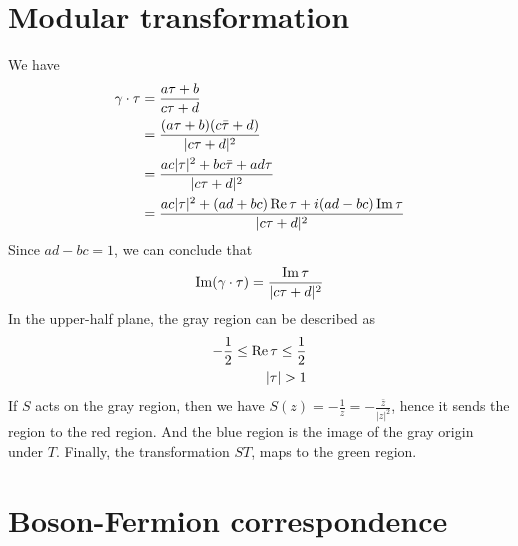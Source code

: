\section{Modular transformation}
We have 
\[
\begin{aligned}
\gamma \cdot \tau &= \frac{a\tau + b}{c\tau + d}\\
& = \frac{(a\tau +b)(c \bar{\tau} +d)}{\lvert c \tau +d \rvert^2}\\
& = \frac{ac \lvert \tau \rvert^2 + bc \bar{\tau} + ad \tau}{\lvert c\tau + d\rvert ^2}\\
& = \frac{ac \lvert \tau \rvert ^2 + (ad+ bc)\operatorname{Re} \tau+ i(ad-bc) \operatorname{Im} \tau}{\lvert c\tau +d \rvert ^2}\\
\end{aligned}
\]
Since $ad-bc=1$, we can conclude that \[\operatorname{Im}(\gamma \cdot \tau) = \frac{\operatorname{Im} \tau}{\lvert c\tau +d\rvert^2}\]
In the upper-half plane, the gray region can be described as
\[
\begin{aligned}
-\frac{1}{2} \leq \operatorname{Re} \tau \leq \frac{1}{2}\\
\lvert \tau \rvert > 1
\end{aligned}
\]
If $S$ acts on the gray region, then we have $S(z) = -\frac{1}{z} = - \frac{\bar{z}}{\lvert z \rvert ^2}$, hence it sends the region to the red region. And the blue region is the image of the gray origin under $T$. Finally, the transformation $ST$, maps to the green region.
\section{Boson-Fermion correspondence}
